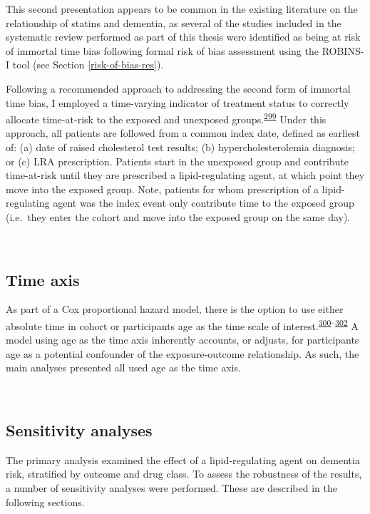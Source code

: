 \documentclass[a4paper, twoside]{templates/ociamthesis}
\begin{document}
This second presentation appears to be common in the existing literature on the relationship of statins and dementia, as several of the studies included in the systematic review performed as part of this thesis were identified as being at risk of immortal time bias following formal risk of bias assessment using the ROBINS-I tool (see Section \ref{risk-of-bias-res}).

Following a recommended approach to addressing the second form of immortal time bias, I employed a time-varying indicator of treatment status to correctly allocate time-at-risk to the exposed and unexposed groups.\textsuperscript{\protect\hyperlink{ref-levesque2010}{299}} Under this approach, all patients are followed from a common index date, defined as earliest of: (a) date of raised cholesterol test results; (b) hypercholesterolemia diagnosis; or (c) LRA prescription. Patients start in the unexposed group and contribute time-at-risk until they are prescribed a lipid-regulating agent, at which point they move into the exposed group. Note, patients for whom prescription of a lipid-regulating agent was the index event only contribute time to the exposed group (i.e.~they enter the cohort and move into the exposed group on the same day).

~

\hypertarget{cprd-time-axis}{%
\subsection{Time axis}\label{cprd-time-axis}}

As part of a Cox proportional hazard model, there is the option to use either absolute time in cohort or participants age as the time scale of interest.\textsuperscript{\protect\hyperlink{ref-lamarca1998}{300}--\protect\hyperlink{ref-pencina2007}{302}} A model using age as the time axis inherently accounts, or adjusts, for participants age as a potential confounder of the exposure-outcome relationship. As such, the main analyses presented all used age as the time axis.

~

\hypertarget{sensitivity-analyses}{%
\subsection{Sensitivity analyses}\label{sensitivity-analyses}}

The primary analysis examined the effect of a lipid-regulating agent on dementia risk, stratified by outcome and drug class. To assess the robustness of the results, a number of sensitivity analyses were performed. These are described in the following sections.
\end{document}
